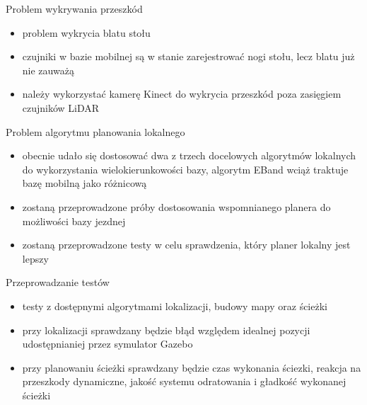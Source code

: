 \begin{frame}
{Problem wykrywania przeszkód}
	\begin{itemize}
		\item problem wykrycia blatu stołu
		\item czujniki w bazie mobilnej są w stanie zarejestrować nogi stołu, lecz blatu już nie zauważą
		\item należy wykorzystać kamerę Kinect do wykrycia przeszkód poza zasięgiem czujników LiDAR
	\end{itemize}
\end{frame}

\begin{frame}
{Problem algorytmu planowania lokalnego}
	\begin{itemize}
		\item obecnie udało się dostosować dwa z trzech docelowych algorytmów lokalnych do wykorzystania wielokierunkowości bazy, algorytm EBand wciąż traktuje bazę mobilną jako różnicową
		\item zostaną przeprowadzone próby dostosowania wspomnianego planera do możliwości bazy jezdnej
		\item zostaną przeprowadzone testy w celu sprawdzenia, który planer lokalny jest lepszy
	\end{itemize}
\end{frame}

\begin{frame}
{Przeprowadzanie testów}
	\begin{itemize}
		\item testy z dostępnymi algorytmami lokalizacji, budowy mapy oraz ścieżki
		\item przy lokalizacji sprawdzany będzie błąd względem idealnej pozycji udostępnianiej przez symulator Gazebo
		\item przy planowaniu ścieżki sprawdzany będzie czas wykonania ściezki, reakcja na przeszkody dynamiczne, jakość systemu odratowania i gładkość wykonanej ścieżki
	\end{itemize}
\end{frame}